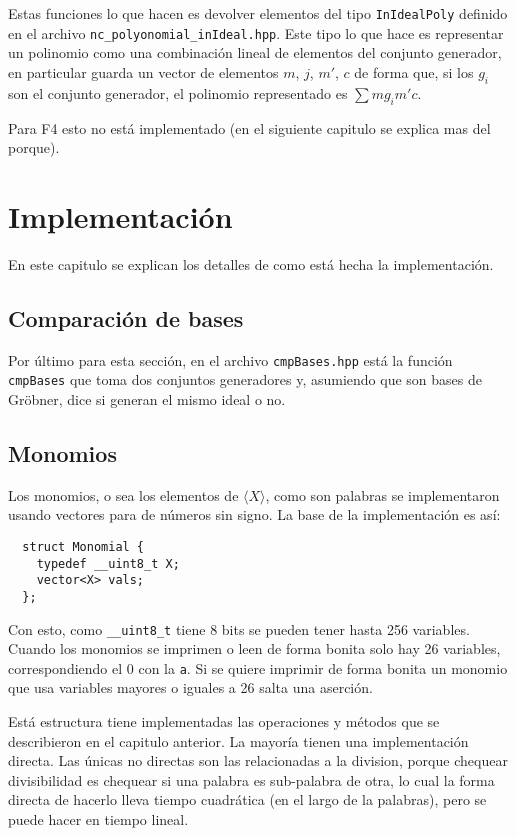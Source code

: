\documentclass{report}
\theoremstyle{customstyle}
\theoremstyle{factstyle}
\begin{document}
Estas funciones lo que hacen es devolver elementos del tipo \texttt{InIdealPoly} definido en el archivo \texttt{nc\_polyonomial\_inIdeal.hpp}. Este tipo lo que hace es representar un polinomio como una combinación lineal de elementos del conjunto generador, en particular guarda un vector de elementos $m$, $j$, $m'$, $c$ de forma que, si los $g_i$ son el conjunto generador, el polinomio representado es $∑ m g_i m' c$.

Para F4 esto no está implementado (en el siguiente capitulo se explica mas del porque).

\chapter{Implementación}

En este capitulo se explican los detalles de como está hecha la implementación.

\section{Comparación de bases}

Por último para esta sección, en el archivo \texttt{cmpBases.hpp} está la función \texttt{cmpBases} que toma dos conjuntos generadores y, asumiendo que son bases de Gröbner, dice si generan el mismo ideal o no.

\section{Monomios}

Los monomios, o sea los elementos de $⟨X⟩$, como son palabras se implementaron usando vectores para de números sin signo. La base de la implementación es así:

\begin{verbatim}
  struct Monomial {
    typedef __uint8_t X;
    vector<X> vals;
  };
\end{verbatim}

Con esto, como \texttt{\_\_uint8\_t} tiene 8 bits se pueden tener hasta 256 variables. Cuando los monomios se imprimen o leen de forma bonita solo hay 26 variables, correspondiendo el 0 con la \texttt{a}. Si se quiere imprimir de forma bonita un monomio que usa variables mayores o iguales a 26 salta una aserción.

Está estructura tiene implementadas las operaciones y métodos que se describieron en el capitulo anterior. La mayoría tienen una implementación directa. Las únicas no directas son las relacionadas a la division, porque chequear divisibilidad es chequear si una palabra es sub-palabra de otra, lo cual la forma directa de hacerlo lleva tiempo cuadrática (en el largo de la palabras), pero se puede hacer en tiempo lineal.
\end{document}
